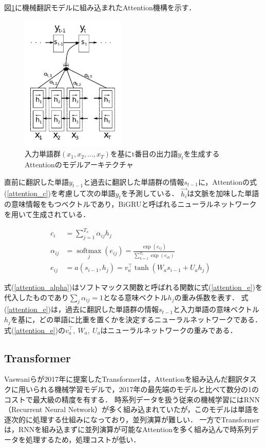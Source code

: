 \documentclass[12pt,a4j,dvipdfmx]{jreport}
\begin{document}
図\ref{fig_attention}に機械翻訳モデルに組み込まれたAttention機構を示す．

\begin{figure}[H]
	\centering
	\includegraphics[keepaspectratio, width=50mm]{img/attention.png}
	\caption{入力単語群$(x_1, x_2, ... , x_T)$を基にt番目の出力語$y_t$を生成するAttentionのモデルアーキテクチャ
  \protect\footnotemark[1]
  }
	\label{fig_attention}
\end{figure}

直前に翻訳した単語$y_{t-1}$と過去に翻訳した単語群の情報$s_{t-1}$に，Attentionの式(\ref{attention_c})を考慮して次の単語$y_t$を予測している．
$\vec{h_i}$は文脈を加味した単語の意味情報をもつベクトルであり，BiGRUと呼ばれるニューラルネットワークを用いて生成されている．

\begin{align}
  c_{i} &= \sum_{j=1}^{T_{x}} \alpha_{i j} h_{j} &
  \label{attention_c}
  \\
  \alpha_{i j} &= \operatorname*{softmax}_j(e_{ij}) = \frac{\exp \left(e_{i j}\right)}{\sum_{k=1}^{T_{x}} \exp \left(e_{i k}\right)}
  \label{attention_alpha}
  \\
  e_{i j} &= a\left(s_{i-1}, h_{j}\right) = v_{a}^{\top} \tanh \left(W_{a} s_{i-1}+U_{a} h_{j}\right)
  \label{attention_e}
\end{align}

式(\ref{attention_alpha})はソフトマックス関数と呼ばれる関数に式(\ref{attention_e})を代入したものであり$\sum_j \alpha_{ij} = 1$となる意味ベクトル$h_j$の重み係数を表す．
式(\ref{attention_e})は，過去に翻訳した単語群の情報$s_{t-1}$と入力単語の意味ベクトル$h_j$を基に，どの単語に比重を置くかを決定するニューラルネットワークである．
式(\ref{attention_e})の$v_{a}^{\top},~ W_{a},~ U_{a}$はニューラルネットワークの重みである．

\subsection{Transformer}
Vaswaniらが2017年に提案したTransformerは，Attentionを組み込んだ翻訳タスクに用いられる機械学習モデルで，2017年の最先端のモデルと比べて数分の1のコストで最大級の精度を有する\cite{aurellen20}\cite{vaswani_attention_nodate}．
時系列データを扱う従来の機械学習にはRNN（Recurrent Neural Network）が多く組み込まれていたが，このモデルは単語を逐次的に処理する仕組みになっており，並列演算が難しい．
一方でTransformerは，RNNを組み込まずに並列演算が可能なAttentionを多く組み込んで時系列データを処理するため，処理コストが低い．
\end{document}

